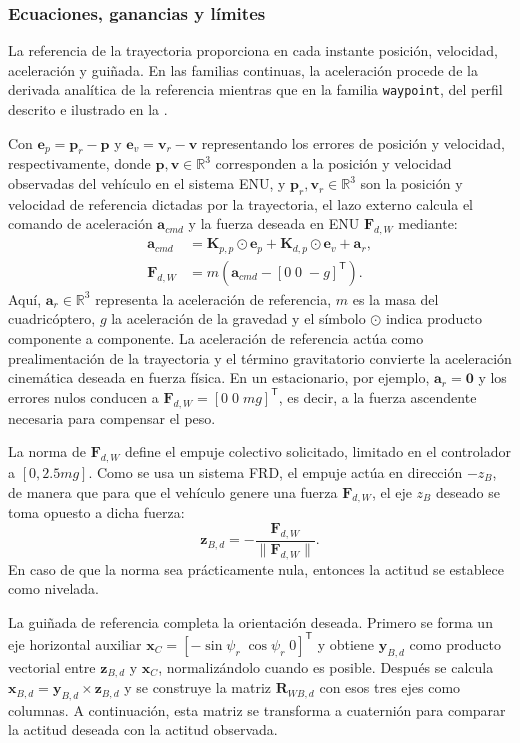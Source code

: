 \subsubsection*{Ecuaciones, ganancias y límites}

La referencia de la trayectoria proporciona en cada instante posición, velocidad,
aceleración y guiñada. En las familias continuas, la aceleración procede de la
derivada analítica de la referencia mientras que en la familia \texttt{waypoint}, del perfil descrito e ilustrado en la .

Con $\bm{e}_p=\bm{p}_r-\bm{p}$ y
$\bm{e}_v=\bm{v}_r-\bm{v}$ representando los errores de posición y velocidad,
respectivamente, donde $\bm{p}, \bm{v} \in \mathbb{R}^3$ corresponden a la
posición y velocidad observadas del vehículo en el sistema ENU, y
$\bm{p}_r, \bm{v}_r \in \mathbb{R}^3$ son la posición y velocidad de referencia
dictadas por la trayectoria, el lazo externo calcula el comando de aceleración
$\bm{a}_{cmd}$ y la fuerza deseada en ENU $\bm{F}_{d,W}$ mediante:
\begin{align}
 \bm{a}_{cmd} &=
 \bm{K}_{p,p}\odot\bm{e}_p+
 \bm{K}_{d,p}\odot\bm{e}_v+\bm{a}_r,\\
 \bm{F}_{d,W} &=
 m\left(\bm{a}_{cmd}-[0\;0\;-g]^\mathsf{T}\right).
 \label{eq:pd-fuerza-deseada}
\end{align}
Aquí, $\bm{a}_r \in \mathbb{R}^3$ representa la aceleración de referencia,
$m$ es la masa del cuadricóptero, $g$ la aceleración de la gravedad y el
símbolo $\odot$ indica producto componente a componente. La aceleración de
referencia actúa como prealimentación de la trayectoria y el término gravitatorio
convierte la aceleración cinemática deseada en fuerza física. En un estacionario,
por ejemplo, $\bm{a}_r=\bm{0}$ y los errores nulos conducen a
$\bm{F}_{d,W}=[0\;0\;mg]^\mathsf{T}$, es decir, a la fuerza ascendente
necesaria para compensar el peso.

La norma de $\bm{F}_{d,W}$ define el empuje colectivo solicitado, limitado en el
controlador a $[0,2.5mg]$. Como se usa un sistema FRD, el empuje actúa en
dirección $-z_B$, de manera que para que el vehículo genere una fuerza
$\bm{F}_{d,W}$, el eje $z_B$ deseado se toma opuesto a dicha fuerza:
\[
 \bm{z}_{B,d}=-\frac{\bm{F}_{d,W}}{\|\bm{F}_{d,W}\|}.
\]
En caso de que la norma sea prácticamente nula, entonces la actitud se establece
como nivelada.

La guiñada de referencia completa la orientación deseada. Primero se forma un eje
horizontal auxiliar
$\bm{x}_C=[-\sin\psi_r\;\cos\psi_r\;0]^\mathsf{T}$ y obtiene
$\bm{y}_{B,d}$ como producto vectorial entre $\bm{z}_{B,d}$ y $\bm{x}_C$,
normalizándolo cuando es posible. Después se calcula
$\bm{x}_{B,d}=\bm{y}_{B,d}\times\bm{z}_{B,d}$ y se construye la matriz
$\bm{R}_{WB,d}$ con esos tres ejes como columnas. A continuación, esta matriz se
transforma a cuaternión para comparar la actitud deseada con la actitud observada.

